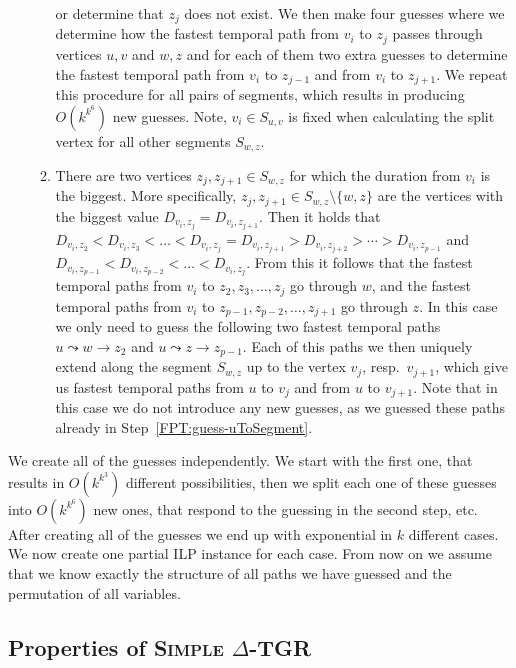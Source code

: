 \documentclass[11pt,a4paper]{article}
\theoremstyle{remark}
\theoremstyle{definition}
\newcommand{\deltaExact}{\textsc{Simple $\Delta$-TGR}}
\begin{document}
\begin{enumerate}
\begin{enumerate}
    or determine that $z_j$ does not exist.
    We then make four guesses where we determine how the fastest temporal path from $v_i$ to $z_j$ passes through vertices $u,v$ and $w,z$ and 
    for each of them two extra guesses to determine the fastest temporal path from $v_i$ to $z_{j-1}$ and from $v_i$ to $z_{j+1}$.
    We repeat this procedure for all pairs of segments,
    which results in producing $O(k^{k^6})$ new guesses.
    Note, $v_i \in S_{u,v}$ is fixed when calculating the split vertex for all other segments $S_{w,z}$.
    \item 
    There are two vertices $z_j, z_{j+1} \in S_{w,z}$ for which the duration from $v_i$ is the biggest.
    More specifically, $z_j, z_{j+1} \in S_{w,z} \setminus \{w,z\}$ are the vertices with the biggest value  $D_{v_i,z_j} = D_{v_i,z_{j+1}}$.
    Then it holds that $D_{v_i,z_2} < D_{v_i,z_3} < \dots < D_{v_i,z_j} = D_{v_i,z_{j+1}} > D_{v_i,z_{j + 2}} > \cdots > D_{v_i,z_{p-1}}$ and 
    $D_{v_i,z_{p-1}} < D_{v_i,z_{p-2}} < \dots < D_{v_i,z_j}$.
    From this it follows that the fastest temporal paths from $v_i$ to $z_2, z_3, \dots, z_{j}$ go through $w$,
    and 
    the fastest temporal paths from $v_i$ to $z_{p-1}, z_{p-2}, \dots, z_{j+1}$ go through $z$.
    In this case we only need to guess the following two fastest temporal paths $u \leadsto w \rightarrow z_2$
    and $u \leadsto z \rightarrow z_{p-1}$.
    Each of this paths we then uniquely extend along the segment $S_{w,z}$ up to the vertex $v_j$, resp.~$v_{j+1}$,
    which give us fastest temporal paths from $u$ to $v_j$ and from $u$ to $v_{j+1}$.
    Note that in this case we do not introduce any new guesses, as we guessed these paths already in Step~\ref{FPT:guess-uToSegment}.
    \end{enumerate}
\end{enumerate}
We create all of the guesses independently.
We start with the first one, that results in $O(k^{k^3})$ different possibilities, then we split each one of these guesses into $O(k^{k^6})$ new ones, that respond to the guessing in the second step, etc.
After creating all of the guesses we end up with exponential in $k$ different cases.
We now create one partial ILP instance for each case.
From now on we assume that we know exactly the structure of all paths we have guessed and the permutation of all variables.

\subsection{Properties of 
\texorpdfstring{\deltaExact } {Simple Delta-TGR}
}
\end{document}

